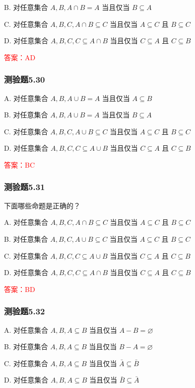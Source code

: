 \documentclass[UTF8, heading=true]{ctexart}
\begin{document}
B. 对任意集合 $A, B, A \cap B=A$ 当且仅当 $B \subseteq A$

C. 对任意集合 $A, B, C, A \cap B \subseteq C$ 当且仅当 $A \subseteq C$ 且 $B \subseteq C$

D. 对任意集合 $A, B, C, C \subseteq A \cap B$ 当且仅当 $C \subseteq A$ 且 $C \subseteq B$

\textcolor{red}{答案：AD}

\subsubsection{测验题5.30}
A. 对任意集合 $A, B, A \cup B=A$ 当且仅当 $A \subseteq B$

B. 
对任意集合 $A, B, A \cup B=A$ 当且仅当 $B \subseteq A$

C. 
对任意集合 $A, B, C, A \cup B \subseteq C$ 当且仅当 $A \subseteq C$ 且 $B \subseteq C$

D. 
对任意集合 $A, B, C, C \subseteq A \cup B$ 当且仅当 $C \subseteq A$ 且 $C \subseteq B$

\textcolor{red}{答案：BC}

\subsubsection{测验题5.31}

下面哪些命题是正确的？

A. 对任意集合 $A, B, C, A \cap B \subseteq C$ 当且仅当 $A \subseteq C$ 且 $B \subseteq C$

B. 对任意集合 $A, B, C, A \cup B \subseteq C$ 当且仅当 $A \subseteq C$ 且 $B \subseteq C$

C. 对任意集合 $A, B, C, C \subseteq A \cup B$ 当且仅当 $C \subseteq A$ 且 $C \subseteq B$

D. 对任意集合 $A, B, C, C \subseteq A \cap B$ 当且仅当 $C \subseteq A$ 且 $C \subseteq B$

\textcolor{red}{答案：BD}

\subsubsection{测验题5.32}

A. 
对任意集合 $A, B, A \subseteq B$ 当且仅当 $A-B=\varnothing$

B. 
对任意集合 $A, B, A \subseteq B$ 当且仅当 $B-A=\varnothing$

C. 
对任意集合 $A, B, A \subseteq B$ 当且仅当 $\bar{A} \subseteq \bar{B}$

D. 
对任意集合 $A, B, A \subseteq B$ 当且仅当 $\bar{B} \subseteq \bar{A}$
\end{document}
